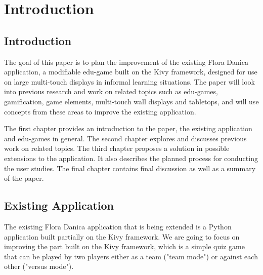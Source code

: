 
\chapter{Introduction}

\label{Chapter1}



\section{Introduction}

The goal of this paper is to plan the improvement of the existing Flora Danica application, a modifiable edu-game built on the Kivy framework\citep{Kivy}, designed for use on large multi-touch displays in informal learning situations. The paper will look into previous research and work on related topics such as edu-games, gamification, game elements, multi-touch wall displays and tabletops, and will use concepts from these areas to improve the existing application.

The first chapter provides an introduction to the paper, the existing application and edu-games in general. The second chapter explores and discusses previous work on related topics. The third chapter proposes a solution in possible extensions to the application. It also describes the planned process for conducting the user studies. The final chapter contains final discussion as well as a summary of the paper.


\section{Existing Application}

The existing Flora Danica application that is being extended is a Python application built partially on the Kivy framework\citep{Kivy}. We are going to focus on improving the part built on the Kivy framework, which is a simple quiz game that can be played by two players either as a team ("team mode") or against each other ("versus mode").

